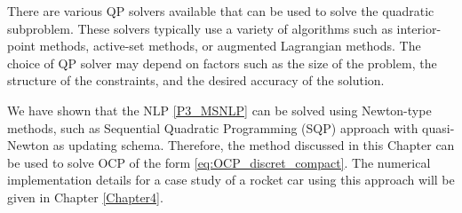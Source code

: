 \documentclass  [
  paper    = a4,
  BCOR     = 10mm,
  twoside,
  fontsize = 12pt,
  fleqn,
  toc      = bibnumbered,
  toc      = listofnumbered,
  numbers  = noendperiod,
  headings = normal,
  listof   = leveldown,
  version  = 3.03
]                                       {scrreprt}
\newcommand{\<}{\langle}
\renewcommand{\>}{\rangle}
\begin{document}
There are various QP solvers available that can be used to solve the quadratic subproblem. These solvers typically use a variety of algorithms such as interior-point methods, active-set methods, or augmented Lagrangian methods. The choice of QP solver may depend on factors such as the size of the problem, the structure of the constraints, and the desired accuracy of the solution.



We have shown that the NLP \ref{P3_MSNLP} can be solved using Newton-type methods, such as Sequential Quadratic Programming (SQP) approach with quasi-Newton as updating schema. Therefore, the method discussed in this Chapter can be used to solve OCP of the form \ref{eq:OCP_discret_compact}. The numerical implementation details for a case study of a rocket car using this approach will be given in Chapter \ref{Chapter4}.

		
\end{document}
